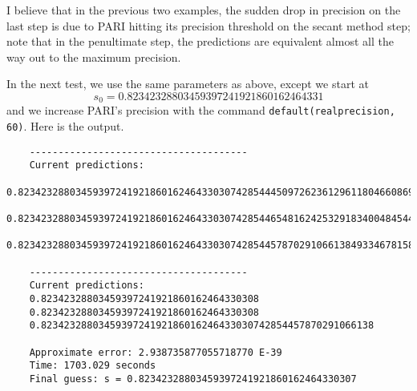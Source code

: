 \documentclass[]{article}
\begin{document}
I believe that in the previous two examples, the sudden drop in precision on the last step is due to PARI hitting its precision threshold on the secant method step; note that in the penultimate step, the predictions are equivalent almost all the way out to the maximum precision.

In the next test, we use the same parameters as above, except we start at
$$
s_0 = 0.82342328803459397241921860162464331
$$
and we increase PARI's precision with the command \verb|default(realprecision, 60)|.
Here is the output.
\begin{verbatim}
	--------------------------------------
	Current predictions:
	0.82342328803459397241921860162464330307428544450972623612961180466086930845089
	0.82342328803459397241921860162464330307428544654816242532918340048454411582866
	0.82342328803459397241921860162464330307428544578702910661384933467815827258805
	
	--------------------------------------
	Current predictions:
	0.82342328803459397241921860162464330308
	0.82342328803459397241921860162464330308
	0.8234232880345939724192186016246433030742854457870291066138
	
	Approximate error: 2.938735877055718770 E-39
	Time: 1703.029 seconds
	Final guess: s = 0.82342328803459397241921860162464330307
	
\end{verbatim}
\end{document}
